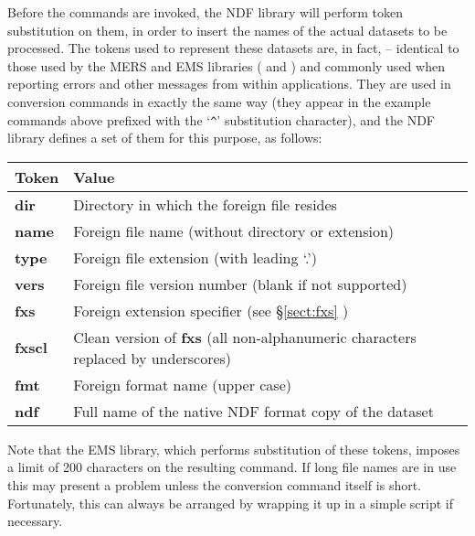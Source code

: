 Before the commands are invoked, the NDF library will perform token
substitution on them, in order to insert the names of the actual
datasets to be processed.  The tokens used to represent these datasets
are, in fact,  -- identical to
those used by the MERS and EMS libraries ( and
) and commonly used when reporting errors and
other messages from within applications.  They are used in conversion
commands in exactly the same way (they appear in the example commands
above prefixed with the `\verb#^#' substitution character), and the
NDF library defines a set of them for this purpose, as follows:

\begin{center}
\begin{tabular}{|l|l|}
\hline
{\bf Token} & {\bf Value}\\
\hline\hline
{\bf dir}   & Directory in which the foreign file resides\\
{\bf name}  & Foreign file name (without directory or extension)\\
{\bf type}  & Foreign file extension (with leading `.')\\
{\bf vers}  & Foreign file version number (blank if not supported)\\
{\bf fxs}   & Foreign extension specifier (see \S\ref{sect:fxs} )\\
{\bf fxscl} & Clean version of {\bf fxs} (all non-alphanumeric characters
replaced by underscores)\\
{\bf fmt}   & Foreign format name (upper case)\\
{\bf ndf}   & Full name of the native NDF format copy of the dataset\\
\hline
\end{tabular}
\end{center}

Note that the EMS library, which performs substitution of these
tokens, imposes a limit of 200 characters on the resulting command. If
long file names are in use this may present a problem unless the
conversion command itself is short. Fortunately, this can always be
arranged by wrapping it up in a simple script if necessary.

